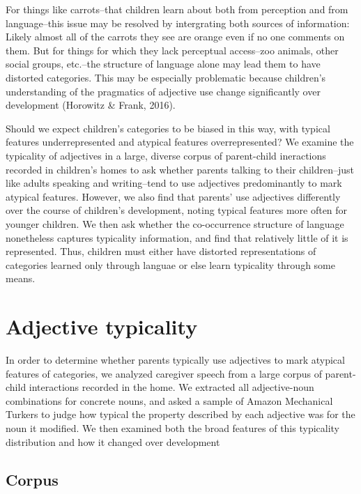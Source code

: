 \documentclass[10pt, letterpaper]{article}
\begin{document}
For things like carrots--that children learn about both from perception
and from language--this issue may be resolved by intergrating both
sources of information: Likely almost all of the carrots they see are
orange even if no one comments on them. But for things for which they
lack perceptual access--zoo animals, other social groups, etc.--the
structure of language alone may lead them to have distorted categories.
This may be especially problematic because children's understanding of
the pragmatics of adjective use change significantly over development
(Horowitz \& Frank, 2016).

Should we expect children's categories to be biased in this way, with
typical features underrepresented and atypical features overrepresented?
We examine the typicality of adjectives in a large, diverse corpus of
parent-child ineractions recorded in children's homes to ask whether
parents talking to their children--just like adults speaking and
writing--tend to use adjectives predominantly to mark atypical features.
However, we also find that parents' use adjectives differently over the
course of children's development, noting typical features more often for
younger children. We then ask whether the co-occurrence structure of
language nonetheless captures typicality information, and find that
relatively little of it is represented. Thus, children must either have
distorted representations of categories learned only through languae or
else learn typicality through some means.

\hypertarget{adjective-typicality}{%
\section{Adjective typicality}\label{adjective-typicality}}

In order to determine whether parents typically use adjectives to mark
atypical features of categories, we analyzed caregiver speech from a
large corpus of parent-child interactions recorded in the home. We
extracted all adjective-noun combinations for concrete nouns, and asked
a sample of Amazon Mechanical Turkers to judge how typical the property
described by each adjective was for the noun it modified. We then
examined both the broad features of this typicality distribution and how
it changed over development

\hypertarget{corpus}{%
\subsection{Corpus}\label{corpus}}
\end{document}
